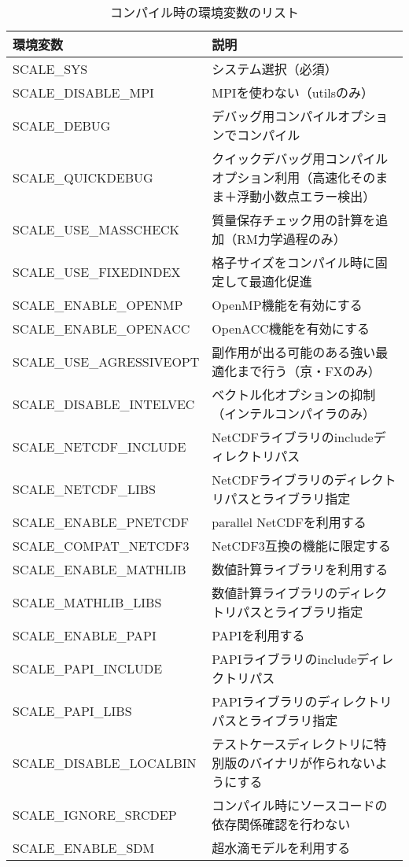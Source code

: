 \begin{table}[htb]
\begin{center}
\caption{コンパイル時の環境変数のリスト}
\begin{tabularx}{150mm}{|l|X|} \hline
 \rowcolor[gray]{0.9} 環境変数 & 説明  \\ \hline
 SCALE\_SYS               & システム選択（必須）  \\ \hline
 SCALE\_DISABLE\_MPI      & MPIを使わない（utilsのみ）  \\ \hline
 SCALE\_DEBUG             & デバッグ用コンパイルオプションでコンパイル  \\ \hline
 SCALE\_QUICKDEBUG        & クイックデバッグ用コンパイルオプション利用（高速化そのまま＋浮動小数点エラー検出）  \\ \hline
 SCALE\_USE\_MASSCHECK    & 質量保存チェック用の計算を追加（RM力学過程のみ）  \\ \hline
 SCALE\_USE\_FIXEDINDEX   & 格子サイズをコンパイル時に固定して最適化促進  \\ \hline
 SCALE\_ENABLE\_OPENMP    & OpenMP機能を有効にする  \\ \hline
 SCALE\_ENABLE\_OPENACC   & OpenACC機能を有効にする  \\ \hline
 SCALE\_USE\_AGRESSIVEOPT & 副作用が出る可能のある強い最適化まで行う（京・FXのみ）  \\ \hline
 SCALE\_DISABLE\_INTELVEC & ベクトル化オプションの抑制（インテルコンパイラのみ）  \\ \hline
 SCALE\_NETCDF\_INCLUDE   & NetCDFライブラリのincludeディレクトリパス  \\ \hline
 SCALE\_NETCDF\_LIBS      & NetCDFライブラリのディレクトリパスとライブラリ指定  \\ \hline
 SCALE\_ENABLE\_PNETCDF   & parallel NetCDFを利用する  \\ \hline
 SCALE\_COMPAT\_NETCDF3   & NetCDF3互換の機能に限定する  \\ \hline
 SCALE\_ENABLE\_MATHLIB   & 数値計算ライブラリを利用する  \\ \hline
 SCALE\_MATHLIB\_LIBS     & 数値計算ライブラリのディレクトリパスとライブラリ指定  \\ \hline
 SCALE\_ENABLE\_PAPI      & PAPIを利用する  \\ \hline
 SCALE\_PAPI\_INCLUDE     & PAPIライブラリのincludeディレクトリパス  \\ \hline
 SCALE\_PAPI\_LIBS        & PAPIライブラリのディレクトリパスとライブラリ指定  \\ \hline
 SCALE\_DISABLE\_LOCALBIN & テストケースディレクトリに特別版のバイナリが作られないようにする  \\ \hline
 SCALE\_IGNORE\_SRCDEP    & コンパイル時にソースコードの依存関係確認を行わない  \\ \hline
 SCALE\_ENABLE\_SDM       & 超水滴モデルを利用する   \\ \hline
\end{tabularx}
\label{tab:env_var_list}
\end{center}
\end{table}


